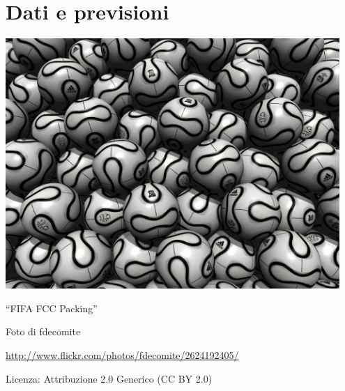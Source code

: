 \part{Dati e previsioni}
\includegraphics[width=0.95\textwidth]{img/fifafcc.jpg}
  \begin{center}
    {\large ``FIFA FCC Packing''}\par
    Foto di fdecomite\par
    \url{http://www.flickr.com/photos/fdecomite/2624192405/}\par
    Licenza: Attribuzione 2.0 Generico (CC BY 2.0)\par
  \end{center}
\clearpage
\cleardoublepage

